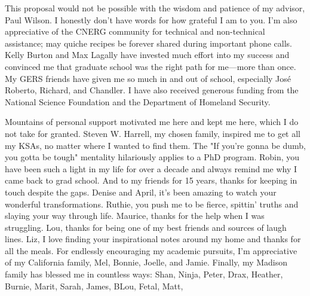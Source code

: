 This proposal would not be possible with the wisdom and patience of my advisor,
Paul Wilson. I honestly don't have words for how grateful I am to you.  I'm
also appreciative of the CNERG community for technical and non-technical
assistance; may quiche recipes be forever shared during important phone calls.
Kelly Burton and Max Lagally have invested much effort into my success and
convinced me that graduate school was the right path for me---more than once.
My GERS friends have given me so much in and out of school, especially Jos\'e
Roberto, Richard, and Chandler.  I have also received generous funding from the
National Science Foundation and the Department of Homeland Security.

Mountains of personal support motivated me here and kept me here, which I do
not take for granted. Steven W. Harrell, my chosen family, inspired me to get
all my KSAs, no matter where I wanted to find them. The "If you're gonna be
dumb, you gotta be tough" mentality hilariously applies to a PhD program.
Robin, you have been such a light in my life for over a decade and always
remind me why I came back to grad school.  And to my friends for 15 years,
thanks for keeping in touch despite the gaps.  Denise and April, it's been
amazing to watch your wonderful transformations. Ruthie, you push me to be
fierce, spittin' truths and slaying your way through life.  Maurice, thanks for
the help when I was struggling. Lou, thanks for being one of my best friends
and sources of laugh lines. Liz, I love finding your inspirational notes around
my home and thanks for all the meals. For endlessly encouraging my academic
pursuits, I'm appreciative of my California family, Mel, Bonnie, Joelle, and
Jamie. Finally, my Madison family has blessed me in countless ways: Shan,
Ninja, Peter, Drax, Heather, Burnie, Marit, Sarah, James, BLou, Fetal, Matt, 

